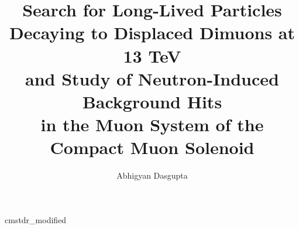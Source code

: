 \documentclass [PhD] {uclathes}
\title          {Search for Long-Lived Particles Decaying to Displaced Dimuons at 13 TeV\\
                 and
                 Study of Neutron-Induced Background Hits\\
                 in the Muon System of the Compact Muon Solenoid}
\author         {Abhigyan Dasgupta}
\begin{document}
\makeintropages












\appendix





 {cmstdr_modified}
\end{document}
